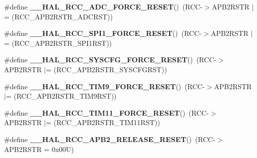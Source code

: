 \begin{DoxyCompactItemize}
\mbox{\label{group___r_c_c___a_p_b2___force___release___reset_ga915c2f73eef5fc0e95d76219280ef6c0}} 
\#define {\bfseries \+\_\+\+\_\+\+H\+A\+L\+\_\+\+R\+C\+C\+\_\+\+A\+D\+C\+\_\+\+F\+O\+R\+C\+E\+\_\+\+R\+E\+S\+ET}()~(R\+CC-\/$>$A\+P\+B2\+R\+S\+TR $\vert$= (R\+C\+C\+\_\+\+A\+P\+B2\+R\+S\+T\+R\+\_\+\+A\+D\+C\+R\+ST))
\item 
\mbox{\label{group___r_c_c___a_p_b2___force___release___reset_ga87e6bc588fa1d5ce3928d2fd2a3156a4}} 
\#define {\bfseries \+\_\+\+\_\+\+H\+A\+L\+\_\+\+R\+C\+C\+\_\+\+S\+P\+I1\+\_\+\+F\+O\+R\+C\+E\+\_\+\+R\+E\+S\+ET}()~(R\+CC-\/$>$A\+P\+B2\+R\+S\+TR $\vert$= (R\+C\+C\+\_\+\+A\+P\+B2\+R\+S\+T\+R\+\_\+\+S\+P\+I1\+R\+ST))
\item 
\mbox{\label{group___r_c_c___a_p_b2___force___release___reset_ga143ff27d8f59a39732efd79539e3765a}} 
\#define {\bfseries \+\_\+\+\_\+\+H\+A\+L\+\_\+\+R\+C\+C\+\_\+\+S\+Y\+S\+C\+F\+G\+\_\+\+F\+O\+R\+C\+E\+\_\+\+R\+E\+S\+ET}()~(R\+CC-\/$>$A\+P\+B2\+R\+S\+TR $\vert$= (R\+C\+C\+\_\+\+A\+P\+B2\+R\+S\+T\+R\+\_\+\+S\+Y\+S\+C\+F\+G\+R\+ST))
\item 
\mbox{\label{group___r_c_c___a_p_b2___force___release___reset_ga9a62b264dec3df075dc7207993a9650e}} 
\#define {\bfseries \+\_\+\+\_\+\+H\+A\+L\+\_\+\+R\+C\+C\+\_\+\+T\+I\+M9\+\_\+\+F\+O\+R\+C\+E\+\_\+\+R\+E\+S\+ET}()~(R\+CC-\/$>$A\+P\+B2\+R\+S\+TR $\vert$= (R\+C\+C\+\_\+\+A\+P\+B2\+R\+S\+T\+R\+\_\+\+T\+I\+M9\+R\+ST))
\item 
\mbox{\label{group___r_c_c___a_p_b2___force___release___reset_gaeaf6b459cfeb85e2e098b78825e476f2}} 
\#define {\bfseries \+\_\+\+\_\+\+H\+A\+L\+\_\+\+R\+C\+C\+\_\+\+T\+I\+M11\+\_\+\+F\+O\+R\+C\+E\+\_\+\+R\+E\+S\+ET}()~(R\+CC-\/$>$A\+P\+B2\+R\+S\+TR $\vert$= (R\+C\+C\+\_\+\+A\+P\+B2\+R\+S\+T\+R\+\_\+\+T\+I\+M11\+R\+ST))
\item 
\mbox{\label{group___r_c_c___a_p_b2___force___release___reset_gae1e413d623154942d5bbe89769161ece}} 
\#define {\bfseries \+\_\+\+\_\+\+H\+A\+L\+\_\+\+R\+C\+C\+\_\+\+A\+P\+B2\+\_\+\+R\+E\+L\+E\+A\+S\+E\+\_\+\+R\+E\+S\+ET}()~(R\+CC-\/$>$A\+P\+B2\+R\+S\+TR = 0x00\+U)

\end{DoxyCompactItemize}
